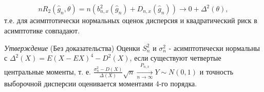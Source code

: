 \[
  nR_2(\hat{g}_n, \theta) = n(b_{n, x}^2(\hat{g}_n) + D_{n, x}(\hat{g}_n)) \xrightarrow[]{} 0 + \Delta^2(\theta)
,\]
т.е. для асимптотически нормальных оценок дисперсия и квадратический риск в асимптотике совпадают.

\textit{Утверждение} (Без доказательства) Оценки $S^2_n$ и $\sigma^2_n$ - асимптотически нормальны с $\Delta^2(X) = E(X - EX)^4 - D^2(X)$, если существуют четвертые центральные моменты,
т. е. $\frac{\sigma^2_n - D(X)}{\Delta(X)}\sqrt{n} \xrightarrow[n \to \infty]{P_{n, x}} Y \sim N(0, 1)$ и точность выборочной дисперсии оценивается моментами 4-го порядка.
